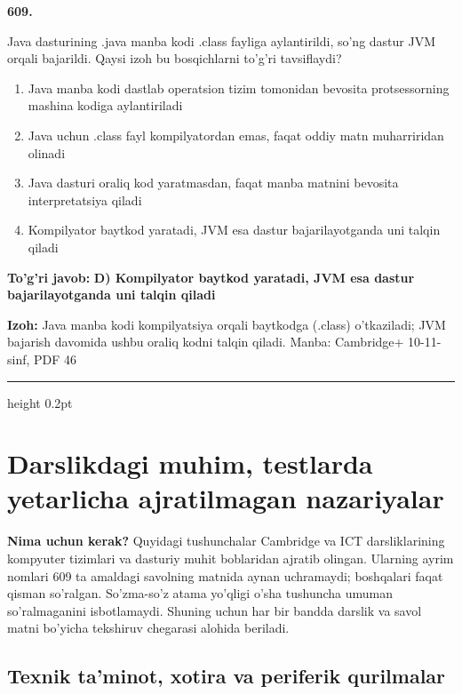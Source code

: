 \documentclass[10pt,a4paper]{article}
\begin{document}
{\bfseries\sffamily\color{ink} 609.}
\par
Java dasturining .java manba kodi .class fayliga aylantirildi, so'ng dastur JVM orqali bajarildi. Qaysi izoh bu bosqichlarni to'g'ri tavsiflaydi?
\begin{enumerate}[label=\Alph*),leftmargin=9mm]
\item Java manba kodi dastlab operatsion tizim tomonidan bevosita protsessorning mashina kodiga aylantiriladi
\item Java uchun .class fayl kompilyatordan emas, faqat oddiy matn muharriridan olinadi
\item Java dasturi oraliq kod yaratmasdan, faqat manba matnini bevosita interpretatsiya qiladi
\item Kompilyator baytkod yaratadi, JVM esa dastur bajarilayotganda uni talqin qiladi
\end{enumerate}
\begin{tcolorbox}[enhanced,breakable,colback=teal!4,colframe=teal!60!black,boxrule=0.45pt,arc=1.2mm,left=2.7mm,right=2.7mm,top=1.8mm,bottom=1.8mm,before skip=2mm,after skip=2mm]
{\bfseries\sffamily\color{teal}To'g'ri javob:} \textbf{D) Kompilyator baytkod yaratadi, JVM esa dastur bajarilayotganda uni talqin qiladi}
\par\smallskip
{\bfseries Izoh:} Java manba kodi kompilyatsiya orqali baytkodga (.class) o'tkaziladi; JVM bajarish davomida ushbu oraliq kodni talqin qiladi. Manba: Cambridge+ 10-11-sinf, PDF 46
\end{tcolorbox}
\vspace{2mm}\hrule height 0.2pt\vspace{3mm}
\clearpage
\section{Darslikdagi muhim, testlarda yetarlicha ajratilmagan nazariyalar}
\textbf{Nima uchun kerak?}
Quyidagi tushunchalar Cambridge va ICT darsliklarining kompyuter
tizimlari va dasturiy muhit boblaridan ajratib olingan. Ularning
ayrim nomlari 609 ta amaldagi savolning matnida aynan uchramaydi;
boshqalari faqat qisman so'ralgan. So'zma-so'z atama yo'qligi o'sha
tushuncha umuman so'ralmaganini isbotlamaydi. Shuning uchun har bir
bandda darslik va savol matni bo'yicha tekshiruv chegarasi alohida beriladi.
\subsection{Texnik ta'minot, xotira va periferik qurilmalar}
\end{document}
